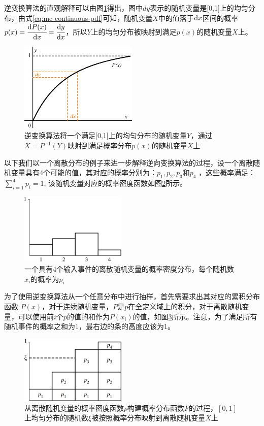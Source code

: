 逆变换算法的直观解释可以由图\ref{f:mc-inversion-method}得出，图中$dy$表示的随机变量是[0,1]上的均匀分布，由式\ref{eq:mc-continuous-pdf}可知，随机变量$X$中的值落于${\rm d}x$区间的概率$p(x)= \cfrac{{\rm d}P(x)}{{\rm d}x}= \cfrac{{\rm d}y}{{\rm d}x}$，所以$Y$上的均匀分布被映射到满足$p(x)$的随机变量$X$上。

\begin{figure}
	\sidecaption
	\includegraphics[width=0.5\textwidth]{figures/mc/inversion-method}
	\caption{逆变换算法将一个满足[0,1]上的均匀分布的随机变量$Y$，通过$X=P^{-1}(Y)$映射到满足概率分布$p(x)$的随机变量$X$上}
	\label{f:mc-inversion-method}
\end{figure}

以下我们以一个离散分布的例子来进一步解释逆向变换算法的过程，设一个离散随机变量具有4个可能的值，其对应的概率分别为：$p_1,p_2,p_3$和$p_4$ ，这些概率满足：$\sum_{i=1}^{4}p_i=1$, 该随机变量对应的概率密度函数如图\ref{f:simple-pdf}所示。

\begin{figure}
\sidecaption
	\includegraphics[width=0.45\textwidth]{figures/mc/mc-3}
	\caption{一个具有4个输入事件的离散随机变量的概率密度分布，每个随机数$x_i$的概率为$p_i$}
	\label{f:simple-pdf}
\end{figure}

为了使用逆变换算法从一个任意分布中进行抽样，首先需要求出其对应的累积分布函数
$P(x)$，对于连续随机变量，$P$是$p$在全定义域上的积分，对于离散随机变量，可以使用前$i$个$p$的值的和作为$P(x_i)$的值，如图\ref{f:mc-discrete-cdf}所示。注意，为了满足所有随机事件的概率之和为1，最右边的条的高度应该为1。

\begin{figure}
\sidecaption
	\includegraphics[width=0.45\textwidth]{figures/mc/mc-4}
	\caption{从离散随机变量的概率密度函数$p$构建概率分布函数$P$的过程，$[0,1]$上均匀分布的随机数$\xi$被按照概率分布映射到离散随机变量$X$上}
	\label{f:mc-discrete-cdf}
\end{figure}

